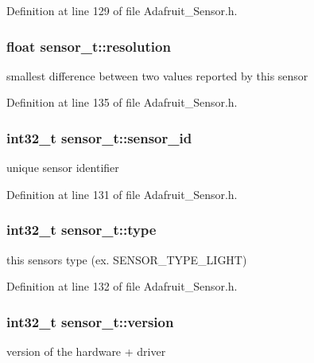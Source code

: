 Definition at line 129 of file Adafruit\+\_\+\+Sensor.\+h.

\subsubsection[{\texorpdfstring{resolution}{resolution}}]{\setlength{\rightskip}{0pt plus 5cm}float sensor\+\_\+t\+::resolution}\hypertarget{structsensor__t_a926aba3216afd50e62c0a6cdbcc7433a}{}\label{structsensor__t_a926aba3216afd50e62c0a6cdbcc7433a}
smallest difference between two values reported by this sensor 

Definition at line 135 of file Adafruit\+\_\+\+Sensor.\+h.

\subsubsection[{\texorpdfstring{sensor\+\_\+id}{sensor\_id}}]{\setlength{\rightskip}{0pt plus 5cm}int32\+\_\+t sensor\+\_\+t\+::sensor\+\_\+id}\hypertarget{structsensor__t_a224f6201d59873cc1b6e9dd8a1894736}{}\label{structsensor__t_a224f6201d59873cc1b6e9dd8a1894736}
unique sensor identifier 

Definition at line 131 of file Adafruit\+\_\+\+Sensor.\+h.

\subsubsection[{\texorpdfstring{type}{type}}]{\setlength{\rightskip}{0pt plus 5cm}int32\+\_\+t sensor\+\_\+t\+::type}\hypertarget{structsensor__t_ae1d59df64438923d3bd95f2416c32203}{}\label{structsensor__t_ae1d59df64438923d3bd95f2416c32203}
this sensor\textquotesingle{}s type (ex. S\+E\+N\+S\+O\+R\+\_\+\+T\+Y\+P\+E\+\_\+\+L\+I\+G\+HT) 

Definition at line 132 of file Adafruit\+\_\+\+Sensor.\+h.

\subsubsection[{\texorpdfstring{version}{version}}]{\setlength{\rightskip}{0pt plus 5cm}int32\+\_\+t sensor\+\_\+t\+::version}\hypertarget{structsensor__t_a274f12a47669fbd2b61935706339e1c2}{}\label{structsensor__t_a274f12a47669fbd2b61935706339e1c2}
version of the hardware + driver 

